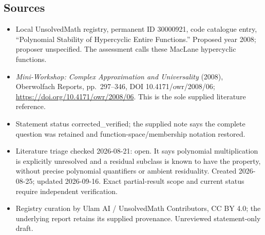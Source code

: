 \documentclass[11pt]{article}
\begin{document}
\subsection{Sources}
\begin{itemize}
\item Local UnsolvedMath registry, permanent ID 30000921, code catalogue entry, ``Polynomial Stability of Hypercyclic Entire Functions.'' Proposed year 2008; proposer unspecified. The assessment calls these MacLane hypercyclic functions.
\item \emph{Mini-Workshop: Complex Approximation and Universality} (2008), Oberwolfach Reports, pp.\ 297--346, DOI 10.4171/owr/2008/06; \url{https://doi.org/10.4171/owr/2008/06}. This is the sole supplied literature reference.
\item Statement status corrected\_verified; the supplied note says the complete question was retained and function-space/membership notation restored.
\item Literature triage checked 2026-08-21: open. It says polynomial multiplication is explicitly unresolved and a residual subclass is known to have the property, without precise polynomial quantifiers or ambient residuality. Created 2026-08-25; updated 2026-09-16. Exact partial-result scope and current status require independent verification.
\item Registry curation by Ulam AI / UnsolvedMath Contributors, CC BY 4.0; the underlying report retains its supplied provenance. Unreviewed statement-only draft.
\end{itemize}
\end{document}
